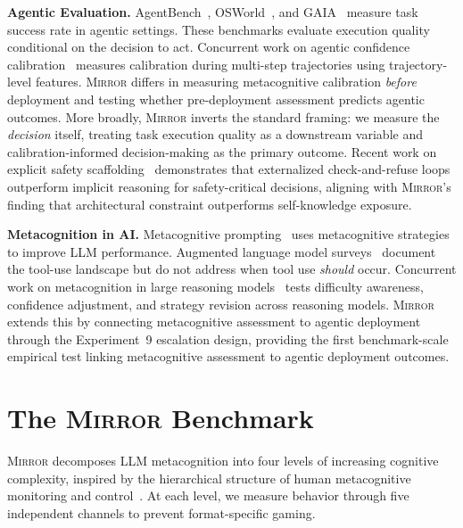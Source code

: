 \documentclass[10pt]{article}
\newcommand{\mirror}{\textsc{Mirror}}
\begin{document}
\textbf{Agentic Evaluation.}
AgentBench~\citep{liu2023agentbench}, OSWorld~\citep{xie2024osworld}, and
GAIA~\citep{mialon2023gaia} measure task success rate in agentic settings. These
benchmarks evaluate execution quality conditional on the decision to act.
Concurrent work on agentic confidence calibration~\citep{htc2026} measures
calibration during multi-step trajectories using trajectory-level features.
\mirror{} differs in measuring metacognitive calibration \textit{before} deployment
and testing whether pre-deployment assessment predicts agentic outcomes. More
broadly, \mirror{} inverts the standard framing: we measure the \textit{decision}
itself, treating task execution quality as a downstream variable and
calibration-informed decision-making as the primary outcome.
Recent work on explicit safety scaffolding~\citep{mosaic2026} demonstrates that
externalized check-and-refuse loops outperform implicit reasoning for
safety-critical decisions, aligning with \mirror{}'s finding that architectural
constraint outperforms self-knowledge exposure.

\textbf{Metacognition in AI.}
Metacognitive prompting~\citep{wang2024metacognitive} uses metacognitive strategies
to improve LLM performance. Augmented language model surveys~\citep{mialon2023augmented}
document the tool-use landscape but do not address when tool use \textit{should}
occur. Concurrent work on metacognition in large reasoning
models~\citep{metacog2026} tests difficulty awareness, confidence adjustment, and
strategy revision across reasoning models. \mirror{} extends this by connecting
metacognitive assessment to agentic deployment through the Experiment~9 escalation
design, providing the first benchmark-scale empirical test linking metacognitive
assessment to agentic deployment outcomes.

\section{The \mirror{} Benchmark}
\label{sec:benchmark}

\mirror{} decomposes LLM metacognition into four levels of increasing cognitive
complexity, inspired by the hierarchical structure of human metacognitive monitoring
and control~\citep{flavell1979metacognition, nelson1990metamemory}. At each level,
we measure behavior through five independent channels to prevent format-specific
gaming.
\end{document}

